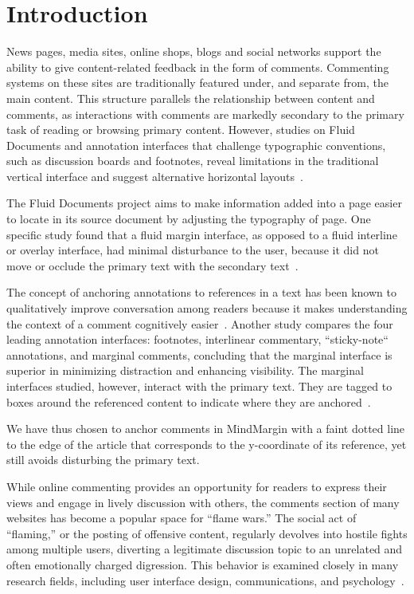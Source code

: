 \section{Introduction}

News pages, media sites, online shops, blogs and social networks support the ability to give content-related feedback in the form of comments. Commenting systems on these sites are traditionally featured under, and separate from, the main content. This structure parallels the relationship between content and comments, as interactions with comments are markedly secondary to the primary task of reading or browsing primary content. However, studies on Fluid Documents and annotation interfaces that challenge typographic conventions, such as discussion boards and footnotes, reveal limitations in the traditional vertical interface and suggest alternative horizontal layouts~\cite{Brush,Guzdial,van,AnnotationsStudents,NewsInterfaces,FluidDocs,NB}. 

The Fluid Documents project aims to make information added into a page easier to locate in its source document by adjusting the typography of page. One specific study found that a fluid margin interface, as opposed to a fluid interline or overlay interface, had minimal disturbance to the user, because it did not move or occlude the primary text with the secondary text~\cite{FluidDocs}. 

The concept of anchoring annotations to references in a text has been known to qualitatively improve conversation among readers because it makes understanding the context of a comment cognitively easier~\cite{Brush,Guzdial,van}. Another study compares the four leading annotation interfaces: footnotes, interlinear commentary, ``sticky-note`` annotations, and marginal comments, concluding that the marginal interface is superior in minimizing distraction and enhancing visibility. The marginal interfaces studied, however, interact with the primary text. They are tagged to boxes around the referenced content to indicate where they are anchored~\cite{AnnotationsStudents}. 

We have thus chosen to anchor comments in MindMargin with a faint dotted line to the edge of the article that corresponds to the y-coordinate of its reference, yet still avoids disturbing the primary text.

While online commenting provides an opportunity for readers to express their views and engage in lively discussion with others, the comments section of many websites has become a popular space for “flame wars.” The social act of “flaming,” or the posting of offensive content, regularly devolves into hostile fights among multiple users, diverting a legitimate discussion topic to an unrelated and often emotionally charged digression. This behavior is examined closely in many research fields, including user interface design, communications, and psychology~\cite{FlamingPsych,FlamingCommunications,FlamingSoftware,FlamingComp}. 

